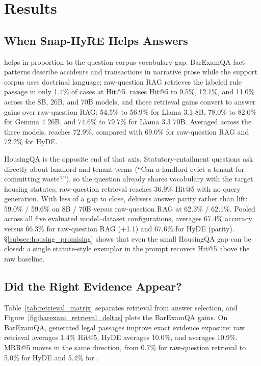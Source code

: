 \section{Results}\label{sec:analysis}

\subsection{When Snap-HyRE Helps Answers}



\hyre{} helps in proportion to the question-corpus vocabulary gap. BarExamQA
fact patterns describe accidents and transactions in narrative prose while
the support corpus uses doctrinal language; raw-question RAG retrieves the
labeled rule passage in only 1.4\% of cases at Hit@5. \hyre{} raises Hit@5
to 9.5\%, 12.1\%, and 11.0\% across the 8B, 26B, and 70B models, and
those retrieval gains convert to answer gains over raw-question RAG: 54.5\%
to 56.9\% for Llama 3.1 8B, 78.0\% to 82.0\% for Gemma 4 26B, and 74.6\% to
79.7\% for Llama 3.3 70B. Averaged across the three models, \hyre{}
reaches 72.9\%, compared with 69.0\% for raw-question RAG and 72.2\% for
HyDE.

HousingQA is the opposite end of that axis. Statutory-entailment questions
ask directly about landlord and tenant terms (``Can a landlord evict a
tenant for committing waste?''), so the question already shares vocabulary
with the target housing statutes; raw-question retrieval reaches 36.9\%
Hit@5 with no query generation. With less of a gap to close, \hyre{}
delivers answer parity rather than lift: 59.0\% / 59.6\% on 8B / 70B versus
raw-question RAG at 62.3\% / 62.1\%. Pooled across all five evaluated
model--dataset configurations, \hyre{} averages 67.4\% accuracy versus 66.3\% for
raw-question RAG (+1.1\pp{}) and 67.6\% for HyDE (parity).
\S\ref{subsec:housing_promising} shows that even the small HousingQA gap
can be closed: a single statute-style exemplar in the \hyre{} prompt
recovers Hit@5 above the raw baseline.

\subsection{Did the Right Evidence Appear?}



Table~\ref{tab:retrieval_matrix} separates retrieval from answer selection,
and Figure~\ref{fig:barexam_retrieval_deltas} plots the BarExamQA gains. On
BarExamQA, generated legal passages improve exact evidence exposure: raw
retrieval averages 1.4\% Hit@5, HyDE averages 10.0\%, and \hyre{} averages
10.9\%. MRR@5 moves in the same direction, from 0.7\% for raw-question
retrieval to 5.0\% for HyDE and 5.4\% for \hyre{}.

